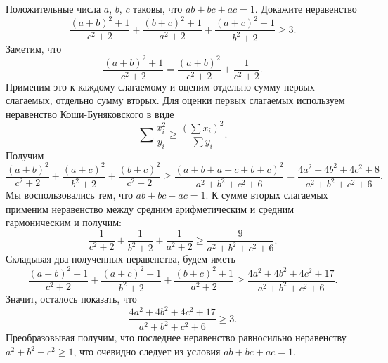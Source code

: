 \problem
Положительные числа $a$, $b$, $c$ таковы, что $a b + b c + a c = 1$.
Докажите неравенство
\[
    \frac{(a + b)^2 + 1}{c^2 + 2}
    +
    \frac{(b + c)^2 + 1}{a^2 + 2}
    +
    \frac{(a + c)^2 + 1}{b^2 + 2}
\geq
    3
.\]
\solution
Заметим, что
\[
    \frac{(a + b)^2 + 1}{c^2 + 2}
=
    \frac{(a + b)^2}{c^2 + 2} + \frac{1}{c^2 + 2}
.\]
Применим это к каждому слагаемому и оценим отдельно сумму первых слагаемых,
отдельно сумму вторых.
Для оценки первых слагаемых используем неравенство Коши-Буняковского в виде
\[
    \sum\frac{x_i^2}{y_i}
\geq
    \frac{(\sum x_i)^2}{\sum y_i}
.\]
Получим
\[
    \frac{(a + b)^2}{c^2 + 2}
    +
    \frac{(a + c)^2}{b^2 + 2}
    +
    \frac{(b + c)^2}{c^2+2}
\geq
    \frac{(a + b + a + c + b + c)^2}{a^2 + b^2 + c^2 + 6}
=
    \frac{4 a^2 + 4 b^2 + 4 c^2 + 8}{a^2 + b^2 + c^2 + 6}
.\]
Мы воспользовались тем, что $a b + b c + a c = 1$.
К сумме вторых слагаемых применим неравенство между средним арифметическим и
средним гармоническим и получим:
\[
    \frac{1}{c^2 + 2}
    +
    \frac{1}{b^2 + 2}
    +
    \frac{1}{a^2 + 2}
\geq
    \frac{9}{a^2 + b^2 + c^2 + 6}
.\]
Складывая два полученных неравенства, будем иметь
\[
    \frac{(a + b)^2 + 1}{c^2 + 2}
    +
    \frac{(a + c)^2 + 1}{b^2 + 2}
    +
    \frac{(b + c)^2 + 1}{a^2 + 2}
\geq
    \frac{4 a^2 + 4 b^2 + 4 c^2 + 17}{a^2 + b^2 + c^2 + 6}.
\]
Значит, осталось показать, что
\[
    \frac{4 a^2 + 4 b^2 + 4 c^2 + 17}{a^2 + b^2 + c^2 + 6}
\geq
    3
.\]
Преобразовывая получим, что последнее неравенство равносильно неравенству
$a^2 + b^2 + c^2 \geq 1$, что очевидно следует из условия
$a b + b c + a c = 1$.
\endproblem
